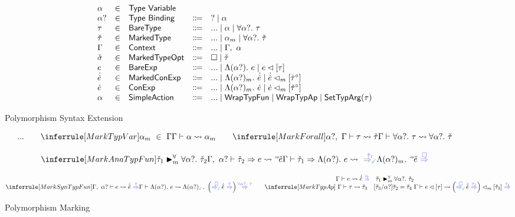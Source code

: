 \begin{figure}
    \[\begin{array}{lcllll}
    \alpha & \in & {\normalfont\textsf{Type Variable}} &  & \\ 
    \alpha? & \in & {\normalfont\textsf{Type Binding}} & \Coloneqq & ? \mid \alpha \\ 
    \tau & \in & {\normalfont\textsf{BareType}} & \Coloneqq & 
        ...
        \mid \alpha \mid \forall \alpha?.~\tau \\ 
    \check{\tau} & \in & {\normalfont\textsf{MarkedType}} & \Coloneqq & 
        ...
        \mid \alpha_{m} \mid \forall \alpha?.~\check{\tau} \\ 
    \Gamma & \in & {\normalfont\textsf{Context}} & \Coloneqq & ... \mid \Gamma , ~\alpha\\
    \check{\sigma} & \in & {\normalfont\textsf{MarkedTypeOpt}} & \Coloneqq & 
        \square
        \mid \check{\tau}\\ 
    e & \in & {\normalfont\textsf{BareExp}} & \Coloneqq & 
        ...
        \mid \Lambda (\alpha?).~e 
        \mid e\lhd[\tau]\\
    \dot{\check{e}} & \in & {\normalfont\textsf{MarkedConExp}} & \Coloneqq & 
        ...
        \mid \Lambda (\alpha?)_{m}.~\dot{\check{e}} 
        \mid \dot{\check{e}}\lhd_{m}[\check{\tau}^{\circ}]\\
    \dot{e} & \in & {\normalfont\textsf{ConExp}} & \Coloneqq & 
        ...
        \mid \Lambda (\alpha?)_{m}.~\dot{e} 
        \mid \dot{e}\lhd_{m}[\check{\tau}^{\circ}]\\
    \alpha & \in & {\normalfont\textsf{SimpleAction}} & \Coloneqq & 
        ... 
        \mid {\normalfont\textsf{WrapTypFun}} \mid {\normalfont\textsf{WrapTypAp}} \mid {\normalfont\textsf{SetTypArg}}(\tau) \\
    \end{array}\]
    \vspace{-10pt}
    \caption{Polymorphism Syntax Extension}
    \label{fig:polymorphism-syntax}
\end{figure}


\begin{figure}
    \centering

    \begin{minipage}{.5\textwidth}
        \centering  
        \judgbox{\MarkTyp{\BTV}{\MTV}}
        \[
        ... \hspace{20pt} \MarkTVar \hspace{20pt} \MarkForall
        \]
    \end{minipage}%
    \begin{minipage}{0.5\textwidth}
        \centering
        \judgbox{\MarkAna{\MTV}{\BEV}{\MELV}}
        \[
        \MarkAnaTFun
        \]
    \end{minipage}

    \judgbox{\MarkSyn{\BEV}{\MEUV}}
    \[
    \MarkSynTFun \hspace{20pt} \MarkTAp
    \]
    
    \vspace{-10pt}
    \caption{Polymorphism Marking}
    \label{fig:polymorphism-marking}
\end{figure}

